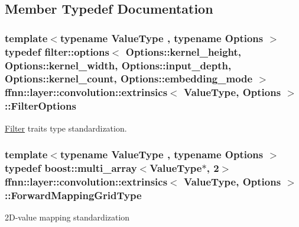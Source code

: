 \subsection{Member Typedef Documentation}
\hypertarget{structffnn_1_1layer_1_1convolution_1_1extrinsics_a0de5368aa5d42881cfd7406cc2762bc5}{
\subsubsection[{Filter\-Options}]{\setlength{\rightskip}{0pt plus 5cm}template$<$typename Value\-Type , typename Options $>$ typedef {\bf filter\-::options}$<$ Options\-::kernel\-\_\-height, Options\-::kernel\-\_\-width, Options\-::input\-\_\-depth, Options\-::kernel\-\_\-count, Options\-::embedding\-\_\-mode $>$ {\bf ffnn\-::layer\-::convolution\-::extrinsics}$<$ Value\-Type, Options $>$\-::{\bf Filter\-Options}}}\label{structffnn_1_1layer_1_1convolution_1_1extrinsics_a0de5368aa5d42881cfd7406cc2762bc5}


\hyperlink{classffnn_1_1layer_1_1convolution_1_1_filter}{Filter} traits type standardization. 

\hypertarget{structffnn_1_1layer_1_1convolution_1_1extrinsics_ac75346616a5d8766c52ccf663bd97170}{
\subsubsection[{Forward\-Mapping\-Grid\-Type}]{\setlength{\rightskip}{0pt plus 5cm}template$<$typename Value\-Type , typename Options $>$ typedef boost\-::multi\-\_\-array$<$Value\-Type$\ast$, 2$>$ {\bf ffnn\-::layer\-::convolution\-::extrinsics}$<$ Value\-Type, Options $>$\-::{\bf Forward\-Mapping\-Grid\-Type}}}\label{structffnn_1_1layer_1_1convolution_1_1extrinsics_ac75346616a5d8766c52ccf663bd97170}


2\-D-\/value mapping standardization 

